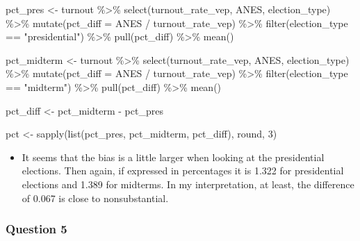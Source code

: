 \documentclass[
  letterpaper,
  DIV=11,
  numbers=noendperiod]{scrartcl}
\newenvironment{Shaded}{\begin{snugshade}}{\end{snugshade}}
\newcommand{\AttributeTok}[1]{\textcolor[rgb]{0.40,0.45,0.13}{#1}}
\newcommand{\DecValTok}[1]{\textcolor[rgb]{0.68,0.00,0.00}{#1}}
\newcommand{\FunctionTok}[1]{\textcolor[rgb]{0.28,0.35,0.67}{#1}}
\newcommand{\NormalTok}[1]{\textcolor[rgb]{0.00,0.23,0.31}{#1}}
\newcommand{\OtherTok}[1]{\textcolor[rgb]{0.00,0.23,0.31}{#1}}
\newcommand{\SpecialCharTok}[1]{\textcolor[rgb]{0.37,0.37,0.37}{#1}}
\newcommand{\StringTok}[1]{\textcolor[rgb]{0.13,0.47,0.30}{#1}}
\providecommand{\tightlist}{%
  \setlength{\itemsep}{0pt}\setlength{\parskip}{0pt}}\usepackage{longtable,booktabs,array}
\begin{document}
\begin{Shaded}
\begin{Highlighting}[]
\NormalTok{pct\_pres }\OtherTok{\textless{}{-}}\NormalTok{ turnout }\SpecialCharTok{\%\textgreater{}\%} 
  \FunctionTok{select}\NormalTok{(turnout\_rate\_vep, ANES, election\_type) }\SpecialCharTok{\%\textgreater{}\%} 
  \FunctionTok{mutate}\NormalTok{(}\AttributeTok{pct\_diff =}\NormalTok{ ANES }\SpecialCharTok{/}\NormalTok{ turnout\_rate\_vep) }\SpecialCharTok{\%\textgreater{}\%} 
  \FunctionTok{filter}\NormalTok{(election\_type }\SpecialCharTok{==} \StringTok{"presidential"}\NormalTok{) }\SpecialCharTok{\%\textgreater{}\%} 
  \FunctionTok{pull}\NormalTok{(pct\_diff) }\SpecialCharTok{\%\textgreater{}\%} 
  \FunctionTok{mean}\NormalTok{()}

\NormalTok{pct\_midterm }\OtherTok{\textless{}{-}}\NormalTok{ turnout }\SpecialCharTok{\%\textgreater{}\%} 
  \FunctionTok{select}\NormalTok{(turnout\_rate\_vep, ANES, election\_type) }\SpecialCharTok{\%\textgreater{}\%} 
  \FunctionTok{mutate}\NormalTok{(}\AttributeTok{pct\_diff =}\NormalTok{ ANES }\SpecialCharTok{/}\NormalTok{ turnout\_rate\_vep) }\SpecialCharTok{\%\textgreater{}\%} 
  \FunctionTok{filter}\NormalTok{(election\_type }\SpecialCharTok{==} \StringTok{"midterm"}\NormalTok{) }\SpecialCharTok{\%\textgreater{}\%} 
  \FunctionTok{pull}\NormalTok{(pct\_diff) }\SpecialCharTok{\%\textgreater{}\%} 
  \FunctionTok{mean}\NormalTok{()}

\NormalTok{pct\_diff }\OtherTok{\textless{}{-}}\NormalTok{ pct\_midterm }\SpecialCharTok{{-}}\NormalTok{ pct\_pres}

\NormalTok{pct }\OtherTok{\textless{}{-}} \FunctionTok{sapply}\NormalTok{(}\FunctionTok{list}\NormalTok{(pct\_pres, pct\_midterm, pct\_diff), round, }\DecValTok{3}\NormalTok{)}
\end{Highlighting}
\end{Shaded}

\begin{itemize}
\tightlist
\item
  It seems that the bias is a little larger when looking at the
  presidential elections. Then again, if expressed in percentages it is
  1.322 for presidential elections and 1.389 for midterms. In my
  interpretation, at least, the difference of 0.067 is close to
  nonsubstantial.
\end{itemize}

\subsubsection{Question 5}\label{question-5}
\end{document}
